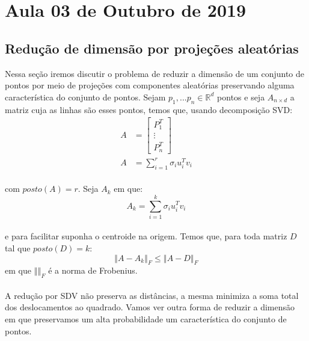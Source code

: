 \section{Aula 03 de Outubro de 2019}
\label{2019_10_03}

\subsection{Redução de dimensão por projeções aleatórias}
Nessa seção iremos discutir o problema de reduzir a dimensão de um conjunto de pontos por meio de projeções com componentes aleatórias preservando alguma característica do conjunto de pontos.
Sejam $p_1,...p_n \in \mathbb{R}^d$ pontos e seja $A_{n \times d}$ a matriz cuja as linhas são esses pontos, temos que, usando decomposição SVD:
\begin{align*}
A &=
  \begin{bmatrix}
    P_1^T \\
    \vdots \\
    P_n^T
  \end{bmatrix}\\
   A &= \sum\limits_{i = 1}^r \sigma_i u_i^T v_i    
\end{align*}

\paragraph{}com $posto(A) = r$. Seja $A_k$ em que: 
\begin{equation*}
    A_k = \sum\limits_{i = 1}^k \sigma_i u_i^T v_i    
\end{equation*}
\paragraph{}e para facilitar suponha o centroide na origem. Temos que, para toda matriz $D$ tal que $ posto(D)=k$:
\begin{equation*}
    \left\Vert A - A_k \right\Vert_F \leq \left\Vert A - D \right\Vert_F
\end{equation*}
em que $\left\Vert \right\Vert_F$ é a norma de Frobenius.
\paragraph{}A redução por SDV não preserva as distâncias, a mesma minimiza a soma total dos deslocamentos ao quadrado. Vamos ver outra forma de reduzir a dimensão em que preservamos um alta probabilidade um característica do conjunto de pontos.
